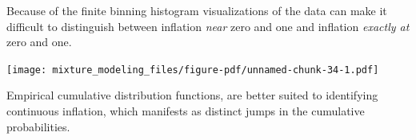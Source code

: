 \documentclass[
  letterpaper,
  DIV=11,
  numbers=noendperiod]{scrartcl}
\newenvironment{Shaded}{\begin{snugshade}}{\end{snugshade}}
\newcommand{\AttributeTok}[1]{\textcolor[rgb]{0.40,0.45,0.13}{#1}}
\newcommand{\DecValTok}[1]{\textcolor[rgb]{0.68,0.00,0.00}{#1}}
\newcommand{\FloatTok}[1]{\textcolor[rgb]{0.68,0.00,0.00}{#1}}
\newcommand{\FunctionTok}[1]{\textcolor[rgb]{0.28,0.35,0.67}{#1}}
\newcommand{\NormalTok}[1]{\textcolor[rgb]{0.00,0.23,0.31}{#1}}
\newcommand{\OtherTok}[1]{\textcolor[rgb]{0.00,0.23,0.31}{#1}}
\newcommand{\SpecialCharTok}[1]{\textcolor[rgb]{0.37,0.37,0.37}{#1}}
\newcommand{\StringTok}[1]{\textcolor[rgb]{0.13,0.47,0.30}{#1}}
\begin{document}
\begin{Shaded}
\end{Shaded}

Because of the finite binning histogram visualizations of the data can
make it difficult to distinguish between inflation \emph{near} zero and
one and inflation \emph{exactly at} zero and one.

\begin{Shaded}
\end{Shaded}

\texttt{[image: mixture\_modeling\_files/figure-pdf/unnamed-chunk-34-1.pdf]}

Empirical cumulative distribution functions, are better suited to
identifying continuous inflation, which manifests as distinct jumps in
the cumulative probabilities.
\end{document}

